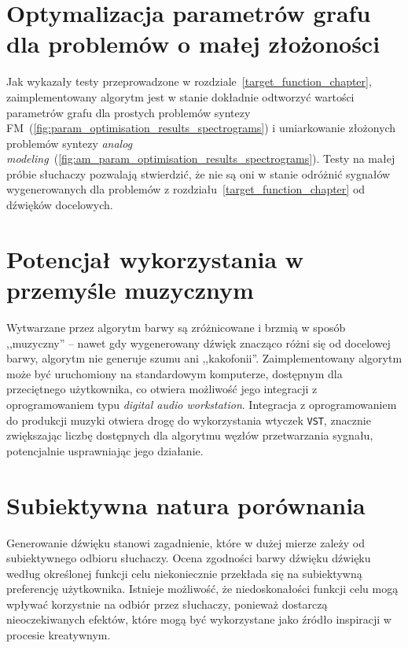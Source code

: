 \section{Optymalizacja parametrów grafu dla problemów o małej złożoności}

Jak wykazały testy przeprowadzone w rozdziale~\ref{target_function_chapter},
zaimplementowany algorytm jest w stanie dokładnie odtworzyć wartości
parametrów grafu dla prostych problemów syntezy
FM~(\ref{fig:param_optimisation_results_spectrograms})
i umiarkowanie złożonych problemów syntezy
\textit{analog modeling}~(\ref{fig:am_param_optimisation_results_spectrograms}).
Testy na małej próbie słuchaczy pozwalają stwierdzić,
że nie są oni w stanie odróżnić sygnałów wygenerowanych
dla problemów z rozdziału~\ref{target_function_chapter}
od dźwięków docelowych.



\section{Potencjał wykorzystania w przemyśle muzycznym}

Wytwarzane przez algorytm barwy są zróżnicowane i brzmią
w sposób ,,muzyczny'' -- nawet gdy wygenerowany dźwięk
znacząco różni się od docelowej barwy, algorytm nie generuje
szumu ani ,,kakofonii''. 
Zaimplementowany algorytm może być uruchomiony na standardowym komputerze,
dostępnym dla przeciętnego użytkownika, co otwiera możliwość jego integracji
z oprogramowaniem typu \textit{digital audio workstation}. Integracja
z oprogramowaniem do produkcji muzyki otwiera drogę do wykorzystania
wtyczek \texttt{VST}, znacznie zwiększając liczbę dostępnych
dla algorytmu węzłów przetwarzania sygnału, potencjalnie usprawniając
jego działanie.


\section{Subiektywna natura porównania}

Generowanie dźwięku stanowi zagadnienie,
które w dużej mierze zależy od subiektywnego odbioru słuchaczy.
Ocena zgodności barwy dźwięku dźwięku według określonej funkcji celu
niekoniecznie przekłada się na subiektywną preferencję użytkownika.
Istnieje możliwość, że niedoskonałości funkcji celu mogą wpływać korzystnie na 
odbiór przez słuchaczy, ponieważ dostarczą nieoczekiwanych efektów, 
które mogą być wykorzystane jako źródło inspiracji w procesie kreatywnym.

